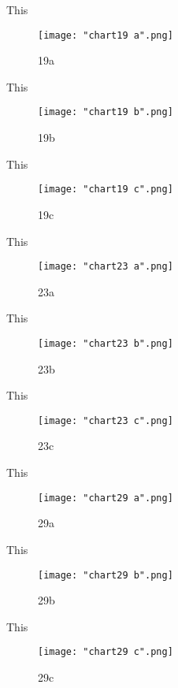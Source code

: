 \documentclass[12pt,letterpaper,oneside,titlepage]{article}
\begin{document}
\pagebreak
\par This
\begin{figure}[h]
	\centering
	\texttt{[image: "chart19 a".png]}
	\caption{19a}
\end{figure}
\pagebreak
\par This
\begin{figure}[h]
	\centering
	\texttt{[image: "chart19 b".png]}
	\caption{19b}
\end{figure}
\pagebreak
\par This
\begin{figure}[h]
	\centering
	\texttt{[image: "chart19 c".png]}
	\caption{19c}
\end{figure}
\pagebreak
\par This
\begin{figure}[h]
	\centering
	\texttt{[image: "chart23 a".png]}
	\caption{23a}
\end{figure}
\pagebreak
\par This
\begin{figure}[h]
	\centering
	\texttt{[image: "chart23 b".png]}
	\caption{23b}
\end{figure}
\pagebreak
\par This
\begin{figure}[h]
	\centering
	\texttt{[image: "chart23 c".png]}
	\caption{23c}
\end{figure}
\pagebreak
\par This
\begin{figure}[h]
	\centering
	\texttt{[image: "chart29 a".png]}
	\caption{29a}
\end{figure}
\pagebreak
\par This
\begin{figure}[h]
	\centering
	\texttt{[image: "chart29 b".png]}
	\caption{29b}
\end{figure}
\pagebreak
\par This
\begin{figure}[h]
	\centering
	\texttt{[image: "chart29 c".png]}
	\caption{29c}
\end{figure}
\pagebreak





\end{document}
